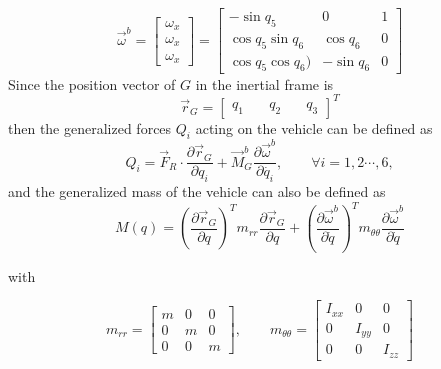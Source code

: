 \documentclass[twocolumn,10pt]{asme2e}
\begin{document}
{ \begin{equation}
 	\vec{\omega}^b=\left[\begin{array}{c}
 		\omega_{x}\\
 		\omega_{x}\\
 		\omega_{x}
 	\end{array}\right]=\left[\begin{array}{ccc} -\sin{q}_{5} & 0 & 1\\ \cos{q}_{5}\sin{q}_{6} & \cos{q}_{6} & 0\\ \cos{q}_{5}\cos{q}_{6}) &-\sin{q}_{6} & 0 \end{array}\right]\end{equation}
Since the position vector of $G$ in the inertial frame is 
\begin{equation}
	\vec{r}_{G}= \left[\begin{array}{ccc}
		q_1&\quad
		q_2&\quad
		q_3
	\end{array}\right]^T
\end{equation}
then the generalized forces $Q_{i}$ acting on the vehicle can be defined  as
\begin{equation}
Q_{i}=\vec{F}_{R}\cdot\frac{\partial\vec{r}_{G}}{\partial q_{i}}+\vec{M}_{G}^b\frac{\partial\vec{\omega}^b}{\partial\dot{q_{i}}}, \qquad \forall i=1,2\cdots, 6,\end{equation}
and the generalized mass of the vehicle can also be defined as
\begin{equation}
M(q)=\left(\frac{\partial\vec{r}_{G}}{\partial q}\right)^{T}m_{rr}\frac{\partial\vec{r}_{G}}{\partial q}+\left(\frac{\partial\vec{\omega}^b}{\partial\dot{q}}\right)^{T}m_{\theta\theta}\frac{\partial\vec{\omega}^b}{\partial\dot{q}}
\end{equation}

with

\begin{equation}
m_{rr}=\left[\begin{array}{ccc}
	m & 0 & 0\\
	0 & m & 0\\
	0 & 0 & m
\end{array}\right],\qquad
m_{\theta\theta}=\left[\begin{array}{ccc}
	I_{xx} & 0 & 0\\
	0 & I_{yy} & 0\\
	0 & 0 & I_{zz}
\end{array}\right]
\end{equation}

}
\end{document}
